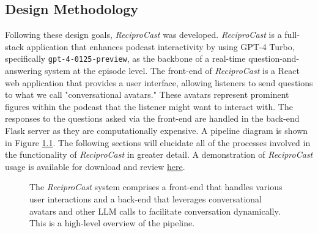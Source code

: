 \documentclass[12pt]{report}
\begin{document}
\begin{myfont}
        \chapter{Design Methodology}
        Following these design goals, \textit{ReciproCast} was developed. \textit{ReciproCast} is a full-stack application that enhances podcast interactivity by using GPT-4 Turbo, specifically \texttt{gpt-4-0125-preview}, as the backbone of a real-time question-and-answering system at the episode level. The front-end of \textit{ReciproCast} is a React web application that provides a user interface, allowing listeners to send questions to what we call "conversational avatars." These avatars represent prominent figures within the podcast that the listener might want to interact with. The responses to the questions asked via the front-end are handled in the back-end Flask server as they are computationally expensive. A pipeline diagram is shown in Figure \ref{fig:pipeline}. The following sections will elucidate all of the processes involved in the functionality of \textit{ReciproCast} in greater detail. A demonstration of \textit{ReciproCast} usage is available for download and review \href{https://github.com/kierankasha/thesis/blob/main/supplementals/Thesis%20Demo.mp4}{here}.

        \begin{figure}[H]
             \noindent
              \caption{The \textit{ReciproCast} system comprises a front-end that handles various user interactions and a back-end that leverages conversational avatars and other LLM calls to facilitate conversation dynamically. This is a high-level overview of the pipeline.}
              \label{fig:pipeline}
        \end{figure}
        

\end{myfont}
\end{document}
